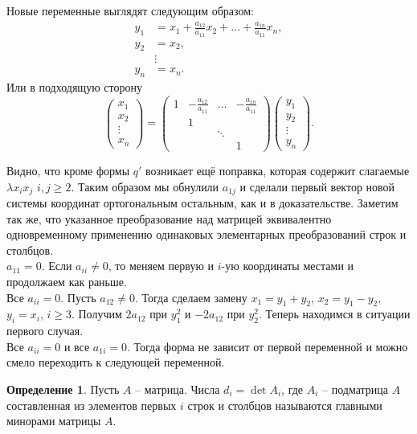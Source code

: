 \documentclass[10pt,a4paper,oneside]{book}
\theoremstyle{definition}
\newtheorem*{defn}{Определение}
\def\dfn{\begin{defn}}
\def\edfn{\end{defn}}
\def\pmat{\begin{pmatrix}}
\def\epmat{\end{pmatrix}}
\begin{document}
Новые переменные выглядят следующим образом:
\begin{align*}
y_1&=x_1+\frac{a_{12}}{a_{11}}x_2 + \dots +\frac{a_{1n}}{a_{11}}x_n,\\
 y_2&=x_2, \\
&\vdots\\
 y_n&=x_n.
\end{align*}
Или в подходящую сторону
$$ \pmat x_1 \\ x_2 \\ \vdots \\ x_n \epmat = \pmat 1 & -\frac{a_{12}}{a_{11}} & \dots & -\frac{a_{1n}}{a_{11}} \\
& 1 && \\
& & \ddots & \\
&&& 1
\epmat \pmat y_1 \\ y_2 \\ \vdots \\ y_n \epmat.
$$

Видно, что кроме формы $q'$ возникает ещё поправка, которая содержит слагаемые $\lambda x_ix_j$ $i,j\geq 2$. Таким образом мы обнулили $a_{1j}$ и сделали первый вектор новой системы координат ортогональным остальным, как и в доказательстве. Заметим так же, что указанное преобразование над матрицей эквивалентно одновременному применению одинаковых элементарных преобразований строк и столбцов.\\




 $a_{11}=0$. Если $a_{ii}\neq 0$, то меняем первую и $i$-ую координаты местами  и продолжаем как раньше. \\


 Все $a_{ii}=0$.
Пусть $a_{12}\neq 0$. Тогда сделаем замену $x_1=y_1+y_2$, $x_2=y_1-y_2$, $y_i=x_i$, $i\geq 3$. Получим $2a_{12}$ при $y_1^2$ и $-2a_{12}$ при $y_2^2$. Теперь находимся в ситуации первого случая.\\


 Все $a_{ii}=0$ и все $a_{1i}=0$. Тогда форма не зависит от первой переменной и можно смело переходить к следующей переменной.\\ 

\dfn Пусть $A$ -- матрица. Числа $d_i=\det A_i$, где $A_i$ -- подматрица $A$ составленная из элементов первых $i$ строк и столбцов  называются главными минорами матрицы $A$.
\edfn
\end{document}
